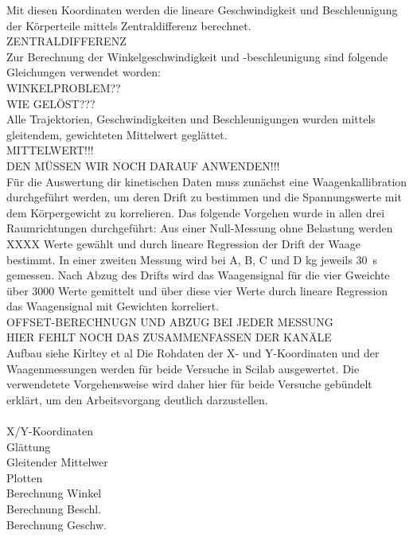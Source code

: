 Mit diesen Koordinaten werden die lineare Geschwindigkeit und Beschleunigung der Körperteile mittels Zentraldifferenz berechnet.\\
ZENTRALDIFFERENZ\\

Zur Berechnung der Winkelgeschwindigkeit und -beschleunigung sind folgende Gleichungen verwendet worden:\\
WINKELPROBLEM??\\
WIE GELÖST???\\

Alle Trajektorien, Geschwindigkeiten und Beschleunigungen wurden mittels gleitendem, gewichteten Mittelwert geglättet.\\
MITTELWERT!!!\\
DEN MÜSSEN WIR NOCH DARAUF ANWENDEN!!!\\
Für die Auswertung dir kinetischen Daten muss zunächst eine Waagenkallibration durchgeführt werden, um deren Drift zu bestimmen und die Spannungswerte mit dem Körpergewicht zu korrelieren. Das folgende Vorgehen wurde in allen drei Raumrichtungen durchgeführt: Aus einer Null-Messung ohne Belastung werden XXXX Werte gewählt und durch lineare Regression der Drift der Waage bestimmt. In einer zweiten Messung wird bei A, B, C und D kg jeweils 30~s gemessen. Nach Abzug des Drifts wird das Waagensignal für die vier Gweichte über 3000 Werte gemittelt und über diese vier Werte durch lineare Regression das Waagensignal mit Gewichten korreliert.\\
OFFSET-BERECHNUGN UND ABZUG BEI JEDER MESSUNG\\
HIER FEHLT NOCH DAS ZUSAMMENFASSEN DER KANÄLE\\


Aufbau siehe Kirltey et al
Die Rohdaten der X- und Y-Koordinaten und der Waagenmessungen werden für beide Versuche in Scilab ausgewertet. Die verwendetete Vorgehensweise wird daher hier für beide Versuche gebündelt erklärt, um den Arbeitsvorgang deutlich darzustellen.\\\\
X/Y-Koordinaten\\
Glättung\\
Gleitender Mittelwer\\
Plotten\\
Berechnung Winkel\\
Berechnung Beschl.\\
Berechnung Geschw.\\
\\

